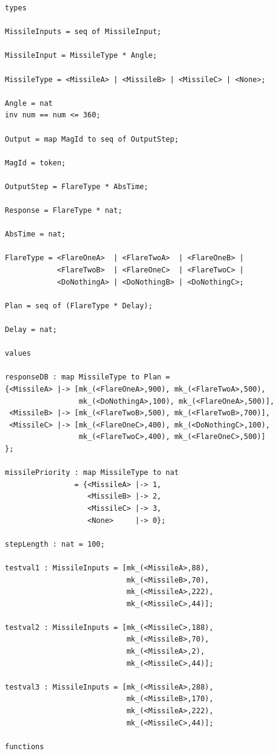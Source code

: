 \documentclass{overturerepchap}
\begin{document}
\begin{lstlisting}
types

MissileInputs = seq of MissileInput;

MissileInput = MissileType * Angle;

MissileType = <MissileA> | <MissileB> | <MissileC> | <None>;

Angle = nat
inv num == num <= 360;

Output = map MagId to seq of OutputStep;

MagId = token;

OutputStep = FlareType * AbsTime;

Response = FlareType * nat;

AbsTime = nat;

FlareType = <FlareOneA>  | <FlareTwoA>  | <FlareOneB> |
            <FlareTwoB>  | <FlareOneC>  | <FlareTwoC> |
            <DoNothingA> | <DoNothingB> | <DoNothingC>;

Plan = seq of (FlareType * Delay);

Delay = nat;

values

responseDB : map MissileType to Plan =
{<MissileA> |-> [mk_(<FlareOneA>,900), mk_(<FlareTwoA>,500),
                 mk_(<DoNothingA>,100), mk_(<FlareOneA>,500)],
 <MissileB> |-> [mk_(<FlareTwoB>,500), mk_(<FlareTwoB>,700)],
 <MissileC> |-> [mk_(<FlareOneC>,400), mk_(<DoNothingC>,100),
                 mk_(<FlareTwoC>,400), mk_(<FlareOneC>,500)]
};

missilePriority : map MissileType to nat
                = {<MissileA> |-> 1,
                   <MissileB> |-> 2,
                   <MissileC> |-> 3,
                   <None>     |-> 0};

stepLength : nat = 100;

testval1 : MissileInputs = [mk_(<MissileA>,88),
                            mk_(<MissileB>,70),
                            mk_(<MissileA>,222),
                            mk_(<MissileC>,44)];

testval2 : MissileInputs = [mk_(<MissileC>,188),
                            mk_(<MissileB>,70),
                            mk_(<MissileA>,2),
                            mk_(<MissileC>,44)];

testval3 : MissileInputs = [mk_(<MissileA>,288),
                            mk_(<MissileB>,170),
                            mk_(<MissileA>,222),
                            mk_(<MissileC>,44)];

functions


\end{lstlisting}
\end{document}
